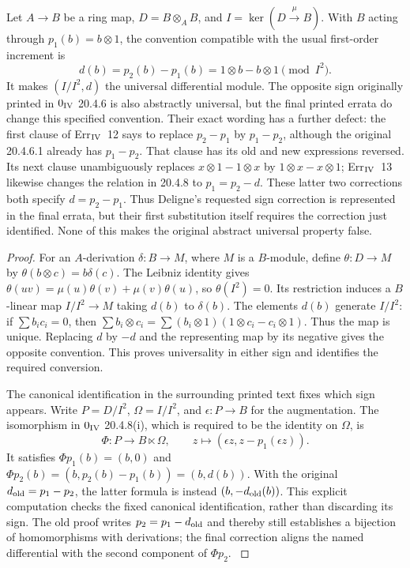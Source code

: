 \begin{proposition}\label{SA23-D-7}
Let $A\to B$ be a ring map, $D=B\otimes_A B$, and
$I=\ker(D\xrightarrow{\mu}B)$.  With $B$ acting through
$p_1(b)=b\otimes1$, the convention compatible with the usual
first-order increment is
\[
 d(b)=p_2(b)-p_1(b)=1\otimes b-b\otimes1\pmod{I^2}.
\]
It makes $(I/I^2,d)$ the universal differential module.  The
opposite sign originally printed in $0_{\rm IV}$ 20.4.6 is also
abstractly universal, but the final printed errata do change this
specified convention.  Their exact wording has a further defect:
the first clause of Err$_{\rm IV}$~12 says to replace $p_2-p_1$
by $p_1-p_2$, although the original 20.4.6.1 already has
$p_1-p_2$.  That clause has its old and new expressions reversed.
Its next clause unambiguously replaces $x\otimes1-1\otimes x$
by $1\otimes x-x\otimes1$; Err$_{\rm IV}$~13 likewise changes
the relation in 20.4.8 to $p_1=p_2-d$.
These latter two corrections both specify $d=p_2-p_1$.
Thus Deligne's requested sign correction is represented in the
final errata, but their first substitution itself requires the
correction just identified.\cite[Err$_{\rm IV}$~12--13,
pp.~347--348]{algEGAIV4}  None of this makes the original
abstract universal property false.
\end{proposition}
\begin{proof}
For an $A$-derivation $\delta:B\to M$, where $M$ is a $B$-module,
define $\theta:D\to M$ by
$\theta(b\otimes c)=b\delta(c)$.  The Leibniz identity gives
$\theta(uv)=\mu(u)\theta(v)+\mu(v)\theta(u)$, so $\theta(I^2)=0$.
Its restriction induces a $B$-linear map $I/I^2\to M$ taking
$d(b)$ to $\delta(b)$.  The elements $d(b)$ generate $I/I^2$:
if $\sum b_i c_i=0$, then
$\sum b_i\otimes c_i=\sum (b_i\otimes1)(1\otimes c_i-c_i\otimes1)$.
Thus the map is unique.  Replacing $d$ by $-d$ and the representing
map by its negative gives the opposite convention.  This proves
universality in either sign and identifies the required conversion.

The canonical identification in the surrounding printed text fixes
which sign appears.  Write $P=D/I^2$, $\Omega=I/I^2$, and
$\epsilon:P\to B$ for the augmentation.  The isomorphism in
$0_{\rm IV}$ 20.4.8(i), which is required to be the identity on
$\Omega$, is
\[
 \Phi:P\longrightarrow B\ltimes\Omega,\qquad
 z\longmapsto(\epsilon z,z-p_1(\epsilon z)).
\]
It satisfies $\Phi p_1(b)=(b,0)$ and
$\Phi p_2(b)=(b,p_2(b)-p_1(b))=(b,d(b))$.  With the original
$d_{\rm old}=p_1-p_2$, the latter formula is instead
$(b,-d_{\rm old}(b))$.  This explicit computation checks the fixed
canonical identification, rather than discarding its sign.  The old
proof writes $p_2=p_1-d_{\rm old}$ and thereby still establishes a
bijection of homomorphisms with derivations; the final correction
aligns the named differential with the second component of $\Phi p_2$.
\cite[20.4.1--20.4.8, pp.~123--126]{algEGAIV1}
\end{proof}

